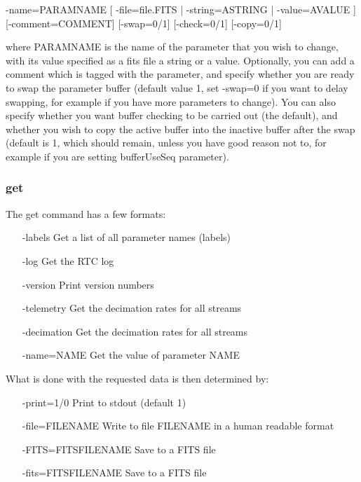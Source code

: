 \documentclass[a4,10pt]{article}
\begin{document}
-name=PARAMNAME [ -file=file.FITS | -string=ASTRING | -value=AVALUE ]
[-comment=COMMENT] [-swap=0/1] [-check=0/1] [-copy=0/1]

where PARAMNAME is the name of the parameter that you wish to change,
with its value specified as a fits file a string or a value.
Optionally, you can add a comment which is tagged with the parameter,
and specify whether you are ready to swap the parameter buffer
(default value 1, set
-swap=0 if you want to delay swapping, for example if you have more
parameters to change).  You can also specify whether you want buffer
checking to be carried out (the default), and whether you wish to copy
the active buffer into the inactive buffer after the swap (default is
1, which should remain, unless you have good reason not to, for
example if you are setting bufferUseSeq parameter).

\subsubsection{get}
The get command has a few formats:
\begin{itemize}
\item[-labels] Get a list of all parameter names (labels)
\item[-log] Get the RTC log
\item[-version] Print version numbers
\item[-telemetry] Get the decimation rates for all streams
\item[-decimation] Get the decimation rates for all streams
\item[-name=NAME] Get the value of parameter NAME
\end{itemize}

What is done with the requested data is then determined by:
\begin{itemize}
\item[-print=1/0] Print to stdout (default 1)
\item[-file=FILENAME] Write to file FILENAME in a human readable
  format
\item[-FITS=FITSFILENAME] Save to a FITS file
\item[-fits=FITSFILENAME] Save to a FITS file
\end{itemize}
\end{document}
